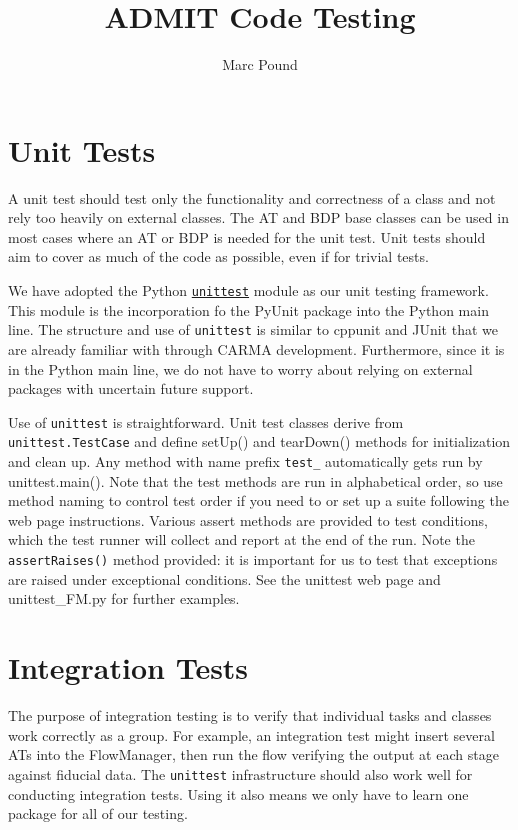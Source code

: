 \documentclass[10pt]{article}
\title{ADMIT Code Testing}
\author{Marc Pound}
\begin{document}
\maketitle

\section{Unit Tests}\label{s-unittests}

A unit test should test only the functionality and correctness of a class
and not rely too heavily on external classes.  The AT and BDP base classes
can be used in most cases where an AT or BDP is needed for the unit test.
Unit tests should aim to cover as much of the code as possible, even
if for trivial tests.

We have adopted the Python
\href{http://docs.python.org/2/library/unittest.html}{\tt unittest}
module as our unit testing framework.  This module is the incorporation
fo the PyUnit package into the Python main line.   The structure and use
of {\tt unittest} is similar to cppunit and JUnit that we are already
familiar with through CARMA development.  Furthermore, since it is in
the Python main line, we do not have to worry about relying on external
packages with uncertain future support.

Use of {\tt unittest} is straightforward. Unit test classes derive
from {\tt unittest.TestCase} and define setUp() and tearDown() methods
for initialization and clean up.   Any method with name prefix {\tt test\_}
automatically gets run by unittest.main().   Note that the test methods
are run in alphabetical order, so use method naming to control test order
if you need to or set up a suite following the web page instructions. 
Various assert methods are provided to test conditions, which the test
runner will collect and report at the end of the run.  Note the {\tt
assertRaises()} method provided: it is important for us to test that
exceptions are raised under exceptional conditions. See the unittest web
page and unittest\_FM.py for further examples.


\section{Integration Tests}\label{s-integrationtests}

The purpose of integration testing is to verify that individual tasks
and classes work correctly as a group.   For example, an integration
test might insert several ATs into the FlowManager, then run the flow
verifying the output at each stage against fiducial data. The {\tt unittest}
infrastructure should also work well for conducting integration tests. Using
it also means we only have to learn one package for all of our testing.
\end{document}
